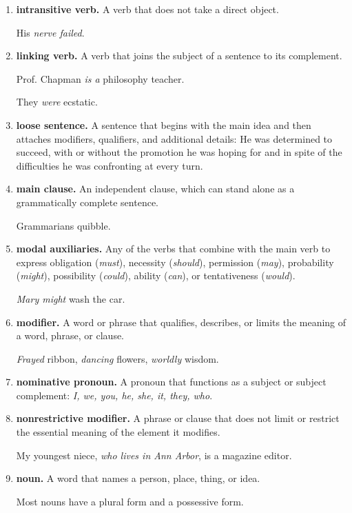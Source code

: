 \documentclass{book}
\numberwithin{equation}{section}
\begin{document}
\begin{enumerate}
    A split infinitive occurs when 1 or more words separate \textit{to} and the verb (\textit{to boldly go}).
    \item \textbf{intransitive verb.} A verb that does not take a direct object.
    
    His \textit{nerve failed}.
    \item \textbf{linking verb.} A verb that joins the subject of a sentence to its complement.
    
    Prof. Chapman \textit{is a} philosophy teacher.
    
    They \textit{were} ecstatic.
    \item \textbf{loose sentence.} A sentence that begins with the main idea and then attaches modifiers, qualifiers, and additional details: He was determined to succeed, with or without the promotion he was hoping for and in spite of the difficulties he was confronting at every turn.
    \item \textbf{main clause.} An independent clause, which can stand alone as a grammatically complete sentence.
    
    Grammarians quibble.
    \item \textbf{modal auxiliaries.} Any of the verbs that combine with the main verb to express obligation (\textit{must}), necessity (\textit{should}), permission (\textit{may}), probability (\textit{might}), possibility (\textit{could}), ability (\textit{can}), or tentativeness (\textit{would}).
    
    \textit{Mary might} wash the car.
    \item \textbf{modifier.} A word or phrase that qualifies, describes, or limits the meaning of a word, phrase, or clause.
    
    \textit{Frayed} ribbon, \textit{dancing} flowers, \textit{worldly} wisdom.
    \item \textbf{nominative pronoun.} A pronoun that functions as a subject or subject complement: \textit{I, we, you, he, she, it, they, who}.
    \item \textbf{nonrestrictive modifier.} A phrase or clause that does not limit or restrict the essential meaning of the element it modifies.
    
    My youngest niece, \textit{who lives in Ann Arbor}, is a magazine editor.
    \item \textbf{noun.} A word that names a person, place, thing, or idea.
    
    Most nouns have a plural form and a possessive form.
    

\end{enumerate}
\end{document}
